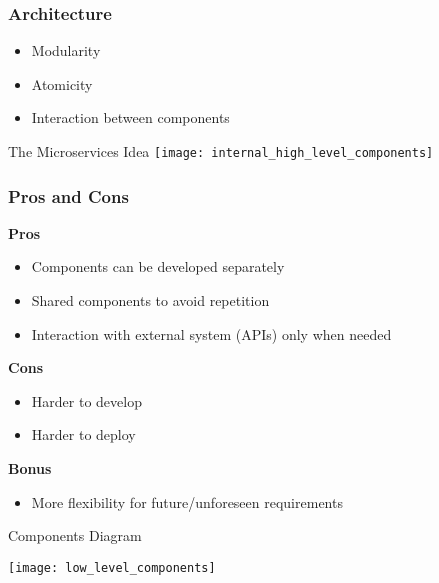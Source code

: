 \begin{frame}
    \frametitle{Architecture}
    \begin{itemize}
        \item Modularity
            \pause
        \item Atomicity
            \pause
        \item Interaction between components
    \end{itemize}
\end{frame}

\begin{frame}{The Microservices Idea}
    \texttt{[image: internal\_high\_level\_components]}
\end{frame}

\begin{frame}
    \frametitle{Pros and Cons}
    \textbf{Pros}
            \pause
    \begin{itemize}
        \item Components can be developed separately
            \pause
        \item Shared components to avoid repetition
            \pause
        \item Interaction with external system (APIs) only when needed
            \pause
    \end{itemize}
    \textbf{Cons}
            \pause
    \begin{itemize}
        \item Harder to develop
            \pause
        \item Harder to deploy
            \pause
    \end{itemize}
    \textbf{Bonus}
            \pause
    \begin{itemize}
        \item More flexibility for future/unforeseen requirements
    \end{itemize}
\end{frame}

\begin{frame}{Components Diagram}
    \begin{center}
        \texttt{[image: low\_level\_components]}
    \end{center}
\end{frame}
